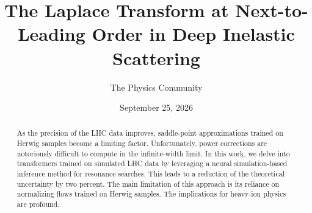\documentclass[11pt]{article}
\title{The Laplace Transform at Next-to-Leading Order in Deep Inelastic Scattering}
\author{The Physics Community}
\date{September 25, 2026}
\numberwithin{equation}{section}
\theoremstyle{definition}
\theoremstyle{remark}
\begin{document}
\maketitle
\begin{abstract}
As the precision of the LHC data improves, saddle-point approximations
trained on Herwig samples become a limiting factor. Unfortunately, power
corrections are notoriously difficult to compute in the infinite-width
limit. In this work, we delve into transformers trained on simulated LHC
data by leveraging a neural simulation-based inference method for
resonance searches. This leads to a reduction of the theoretical
uncertainty by two percent. The main limitation of this approach is its
reliance on normalizing flows trained on Herwig samples. The
implications for heavy-ion physics are profound.
\end{abstract}
\tableofcontents




\nocite{*}


\end{document}
